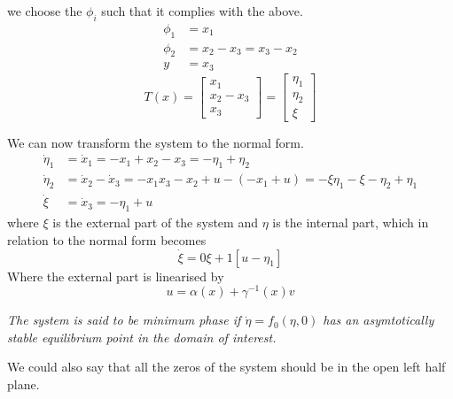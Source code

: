 we choose the $\phi_i$ such that it complies with the above.
\begin{equation}
        \begin{split}
                \phi_1 &= x_1 \\
                \phi_2 &= x_2 - x_3 = x_3 - x_2 \\
                y &= x_3
        \end{split}
\end{equation}
\begin{equation}
        T(x) = 
        \begin{bmatrix}
                x_1 \\
                x_2 - x_3 \\
                x_3
        \end{bmatrix}
        =
        \begin{bmatrix}
                \eta_1 \\
                \eta_2 \\
                \xi
        \end{bmatrix}
\end{equation}

We can now transform the system to the normal form.
\begin{equation}
        \begin{split}
        \dot{\eta}_{1} &= \dot{x}_{1} = -x_1 + x_2 - x_3 = -\eta_1 + \eta_2 \\
        \dot{\eta}_2 &= \dot{x}_2 - \dot{x}_3 = -x_1 x_3 - x_2 + u - (-x_1 + u) = -\xi \eta_1 - \xi - \eta_2 + \eta_1 \\
        \dot{\xi} &= \dot{x}_3 = -\eta_1 + u
        \end{split}
\end{equation}
where $\xi$ is the external part of the system and $\eta$ is the internal part, which in relation to the normal form becomes
\begin{equation}
        \dot{\xi} = 0\xi + 1\left[u - \eta_1\right]
\end{equation}
Where the external part is linearised by
\begin{equation}
        u = \alpha(x) + \gamma^{-1} (x) v
\end{equation}

\textit{The system is said to be minimum phase if $\dot{\eta} = f_0(\eta,0)$ has an asymtotically stable equilibrium point in the domain of interest.}

We could also say that all the zeros of the system should be in the open left half plane.

